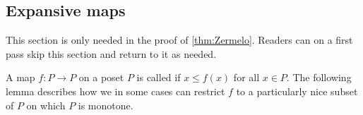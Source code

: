 



\subsection{Expansive maps}

This section is only needed in the proof of \cref{thm:Zermelo}. Readers can on a first pass skip this section and return to it as needed.

A map $f \colon P \to P$ on a poset $P$ is called  if $x \leq f(x)$ for all $x \in P$. The following lemma describes how we in some cases can restrict $f$ to a particularly nice subset of $P$ on which $P$ is monotone.


